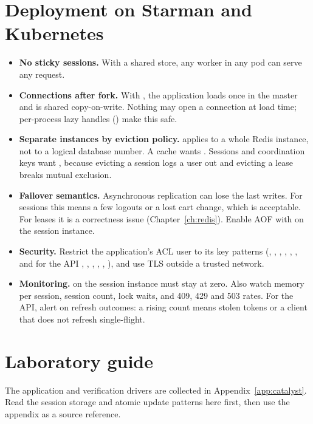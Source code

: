 \section{Deployment on Starman and Kubernetes}
\begin{itemize}
\item \textbf{No sticky sessions.} With a shared store, any worker in any pod can serve any request.
\item \textbf{Connections after fork.} With , the application loads once in the master and is shared copy-on-write. Nothing may open a connection at load time; per-process lazy handles () make this safe.
\item \textbf{Separate instances by eviction policy.}  applies to a whole Redis instance, not to a logical database number. A cache wants . Sessions and coordination keys want , because evicting a session logs a user out and evicting a lease breaks mutual exclusion.
\item \textbf{Failover semantics.} Asynchronous replication can lose the last writes. For sessions this means a few logouts or a lost cart change, which is acceptable. For leases it is a correctness issue (Chapter~\ref{ch:redis}). Enable AOF with  on the session instance.
\item \textbf{Security.} Restrict the application's ACL user to its key patterns (, , , , , , and for the API , , , , , ), and use TLS outside a trusted network.
\item \textbf{Monitoring.}  on the session instance must stay at zero. Also watch memory per session, session count, lock waits, and 409, 429 and 503 rates. For the API, alert on refresh outcomes: a rising  count means stolen tokens or a client that does not refresh single-flight.
\end{itemize}

\section{Laboratory guide}
The application and verification drivers are collected in Appendix~\ref{app:catalyst}.
Read the session storage and atomic update patterns here first, then use
the appendix as a source reference.
